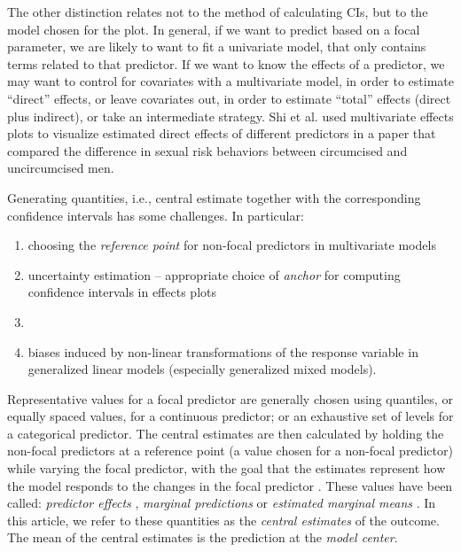 The other distinction relates not to the method of calculating CIs, but to the model chosen for the plot. 
In general, if we want to predict based on a focal parameter, we are likely to want to fit a univariate model, that only contains terms related to that predictor.
If we want to know the effects of a predictor, we may want to control for covariates with a multivariate model, in order to estimate “direct” effects, or leave covariates out, in order to estimate “total” effects (direct plus indirect), or take an intermediate strategy.
Shi et al. \citep{shi_evidence_2017} used multivariate effects plots to visualize estimated direct effects of different predictors in a paper that compared the difference in sexual risk behaviors between circumcised and uncircumcised men.

Generating quantities, i.e., central estimate together with the corresponding confidence intervals has some challenges. In particular:
\begin{enumerate}
\item choosing the \emph{reference point} for non-focal predictors in multivariate models
\item uncertainty estimation -- appropriate choice of \emph{anchor} for computing confidence intervals in effects plots
\item {}  
\item biases induced by non-linear transformations of the response variable in generalized linear models (especially generalized mixed models).
\end{enumerate}

Representative values for a focal predictor are generally chosen using quantiles, or equally spaced values, for a continuous predictor; or an exhaustive set of levels for a categorical predictor.
The central estimates are then calculated by holding the non-focal predictors at a reference point (a value chosen for a non-focal predictor) while varying the focal predictor, with the goal that the estimates represent how the model responds to the changes in the focal predictor \citep{fox2009effect, hanmer2013behind}. These values have been called: \emph{predictor effects} \citep{fox2009effect}, \emph{marginal predictions} \citep{leeper2017package} or \emph{estimated marginal means} \citep{lenth2018package}  . In this article, we refer to these quantities as the \emph{central estimates} of the outcome. The mean of the central estimates is the prediction at the \emph{model center}. 

